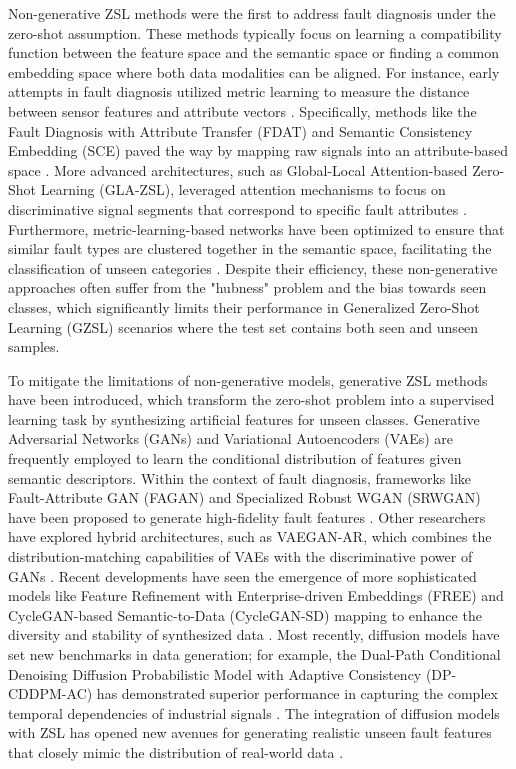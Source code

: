 Non-generative ZSL methods were the first to address fault diagnosis under the zero-shot assumption. These methods typically focus on learning a compatibility function between the feature space and the semantic space or finding a common embedding space where both data modalities can be aligned. For instance, early attempts in fault diagnosis utilized metric learning to measure the distance between sensor features and attribute vectors \cite{Li2020}. Specifically, methods like the Fault Diagnosis with Attribute Transfer (FDAT) and Semantic Consistency Embedding (SCE) paved the way by mapping raw signals into an attribute-based space \cite{Wang2021a}. More advanced architectures, such as Global-Local Attention-based Zero-Shot Learning (GLA-ZSL), leveraged attention mechanisms to focus on discriminative signal segments that correspond to specific fault attributes \cite{Chen2022}. Furthermore, metric-learning-based networks have been optimized to ensure that similar fault types are clustered together in the semantic space, facilitating the classification of unseen categories \cite{Grover2023, Zhang2022}. Despite their efficiency, these non-generative approaches often suffer from the "hubness" problem and the bias towards seen classes, which significantly limits their performance in Generalized Zero-Shot Learning (GZSL) scenarios where the test set contains both seen and unseen samples.

To mitigate the limitations of non-generative models, generative ZSL methods have been introduced, which transform the zero-shot problem into a supervised learning task by synthesizing artificial features for unseen classes. Generative Adversarial Networks (GANs) and Variational Autoencoders (VAEs) are frequently employed to learn the conditional distribution of features given semantic descriptors. Within the context of fault diagnosis, frameworks like Fault-Attribute GAN (FAGAN) and Specialized Robust WGAN (SRWGAN) have been proposed to generate high-fidelity fault features \cite{Yan2021, Zhao2022}. Other researchers have explored hybrid architectures, such as VAEGAN-AR, which combines the distribution-matching capabilities of VAEs with the discriminative power of GANs \cite{Xu2021}. Recent developments have seen the emergence of more sophisticated models like Feature Refinement with Enterprise-driven Embeddings (FREE) and CycleGAN-based Semantic-to-Data (CycleGAN-SD) mapping to enhance the diversity and stability of synthesized data \cite{Devos2023, Kim2022}. Most recently, diffusion models have set new benchmarks in data generation; for example, the Dual-Path Conditional Denoising Diffusion Probabilistic Model with Adaptive Consistency (DP-CDDPM-AC) has demonstrated superior performance in capturing the complex temporal dependencies of industrial signals \cite{Mao2024}. The integration of diffusion models with ZSL has opened new avenues for generating realistic unseen fault features that closely mimic the distribution of real-world data \cite{Ho2020, Rombach2022}.

